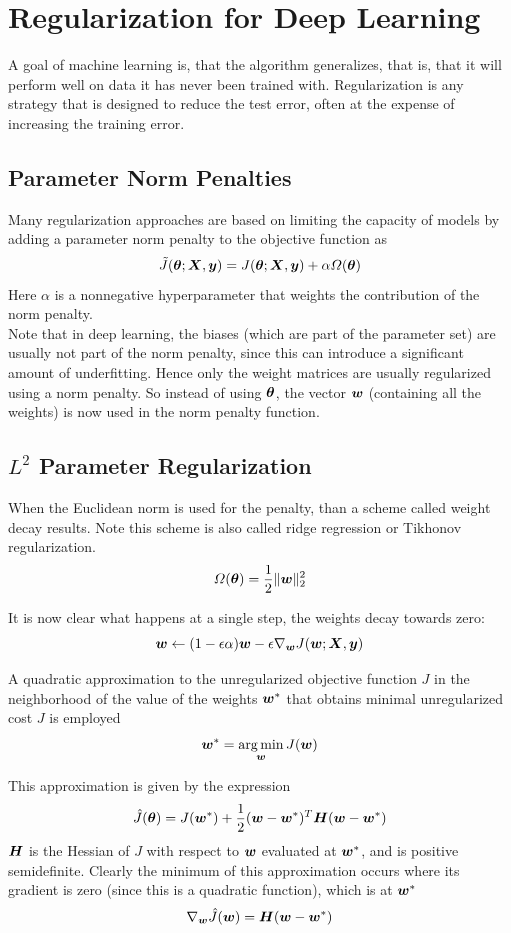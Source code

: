 \section{Regularization for Deep Learning}
\begin{multicols}{2}
	A goal of machine learning is, that the algorithm generalizes, that is, that it will perform well on data it has never been trained with.
	Regularization is any strategy that is designed to reduce the test error, often at the expense of increasing the training error.

	\subsection{Parameter Norm Penalties}
	Many regularization approaches are based on limiting the capacity of models by adding a parameter norm penalty to the objective function as
	\[ \tilde{J}(\bolt;\mX,\vy) = J(\bolt;\mX,\vy)+\alpha\Omega(\bolt) \]
	Here $\alpha$ is a nonnegative hyperparameter that weights the contribution of the norm penalty.\\

	Note that in deep learning, the biases (which are part of the parameter set) are usually not part of the norm penalty, since this can introduce a significant amount of underfitting. Hence only the weight matrices are usually regularized using a norm penalty. So instead of using $\bolt$, the vector ${\bm{w}}$ (containing all the weights) is now used in the norm penalty function.

	\subsection{$L^2$ Parameter Regularization}
	When the Euclidean norm is used for the penalty, than a scheme called weight decay results.
	Note this scheme is also called ridge regression or Tikhonov regularization.
	\[ \Omega(\bolt) = \frac{1}{2} \lVert \vw \rVert_2^2 \]

	It is now clear what happens at a single step, the weights decay towards zero:
	\[ {\bm{w}} \leftarrow (1-\epsilon\alpha){\bm{w}}-\epsilon\nabla_{\bm{w}} J({\bm{w}};{\bm{X}},{\bm{y}}) \]

	A quadratic approximation to the unregularized objective function $J$ in the neighborhood of the value of the weights ${\bm{w}}^\ast$ that obtains minimal unregularized cost $J$ is employed
	\[ {\bm{w}}^\ast = \operatorname*{arg\,min}_{\bm{w}} J({\bm{w}}) \]

	This approximation is given by the expression
	\[ \hat{J}(\bolt) = J(\vw^\ast)+\half(\vw-\vw^\ast)^T\mH(\vw-\vw^\ast) \]
	${\bm{H}}$ is the Hessian of $J$ with respect to ${\bm{w}}$ evaluated at ${\bm{w}}^\ast$, and is positive semidefinite.
	Clearly the minimum of this approximation occurs where its gradient is zero (since this is a quadratic function), which is at ${\bm{w}}^\ast$
	\[ \nabla_{\bm{w}} \hat{J}({\bm{w}})={\bm{H}}({\bm{w}}-{\bm{w}}^\ast) \]


\end{multicols}
